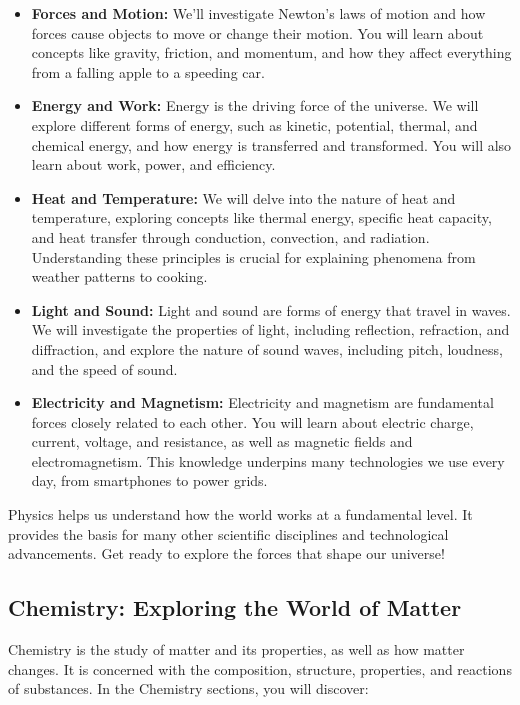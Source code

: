 \begin{itemize}
    \item \textbf{Forces and Motion:}  We'll investigate Newton's laws of motion and how forces cause objects to move or change their motion.  You will learn about concepts like gravity, friction, and momentum, and how they affect everything from a falling apple to a speeding car.
    \item \textbf{Energy and Work:}  Energy is the driving force of the universe.  We will explore different forms of energy, such as kinetic, potential, thermal, and chemical energy, and how energy is transferred and transformed.  You will also learn about work, power, and efficiency.
    \item \textbf{Heat and Temperature:}  We will delve into the nature of heat and temperature, exploring concepts like thermal energy, specific heat capacity, and heat transfer through conduction, convection, and radiation.  Understanding these principles is crucial for explaining phenomena from weather patterns to cooking.
    \item \textbf{Light and Sound:}  Light and sound are forms of energy that travel in waves.  We will investigate the properties of light, including reflection, refraction, and diffraction, and explore the nature of sound waves, including pitch, loudness, and the speed of sound.
    \item \textbf{Electricity and Magnetism:}  Electricity and magnetism are fundamental forces closely related to each other.  You will learn about electric charge, current, voltage, and resistance, as well as magnetic fields and electromagnetism.  This knowledge underpins many technologies we use every day, from smartphones to power grids.
\end{itemize}

Physics helps us understand how the world works at a fundamental level.  It provides the basis for many other scientific disciplines and technological advancements.  Get ready to explore the forces that shape our universe!

\FloatBarrier

\subsection{Chemistry: Exploring the World of Matter}

Chemistry is the study of matter and its properties, as well as how matter changes.  It is concerned with the composition, structure, properties, and reactions of substances.  In the Chemistry sections, you will discover:

